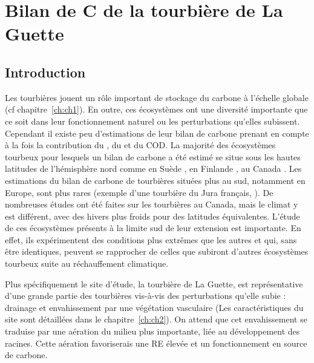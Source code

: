 \singlespacing
\chapter{Bilan de C de la tourbière de La Guette}
\label{ch:ch3}

\minitoc

\newpage
\doublespacing
\section{Introduction}
Les tourbières jouent un rôle important de stockage du carbone à l'échelle globale (cf chapitre~\ref{ch:ch1}).
En outre, ces écosystèmes ont une diversité importante que ce soit dans leur fonctionnement naturel ou les perturbations qu'elles subissent.
Cependant il existe peu d'estimations de leur bilan de carbone prenant en compte à la fois la contribution du \coo, du \chh et du COD.
La majorité des écosystèmes tourbeux pour lesquels un bilan de carbone a été estimé se situe sous les hautes latitudes de l'hémisphère nord comme en Suède \citep{waddington2000,peichl2014}, en Finlande \citep{Alm1997}, au Canada \citep{trudeau2014}.
Les estimations du bilan de carbone de tourbières situées plus au sud, notamment en Europe, sont plus rares (exemple d'une tourbière du Jura français, \citealp{bortoluzzi2006a}). 
De nombreuses études ont été faites sur les tourbières au Canada, mais le climat y est différent, avec des hivers plus froids pour des latitudes équivalentes.
L'étude de ces écosystèmes présents à la limite sud de leur extension est importante.
En effet, ils expérimentent des conditions plus extrêmes que les autres et qui, sans être identiques, peuvent se rapprocher de celles que subiront d'autres écosystèmes tourbeux suite au réchauffement climatique.

Plus spécifiquement le site d'étude, la tourbière de La Guette, est représentative d'une grande partie des tourbières vis-à-vis des perturbations qu'elle subie : drainage et envahissement par une végétation vasculaire (Les caractéristiques du site sont détaillées dans le chapitre~\ref{ch:ch2}).
On attend que cet envahissement se traduise par une aération du milieu plus importante, liée au développement des racines.
Cette aération favoriserais une RE élevée et un fonctionnement en source de carbone.

